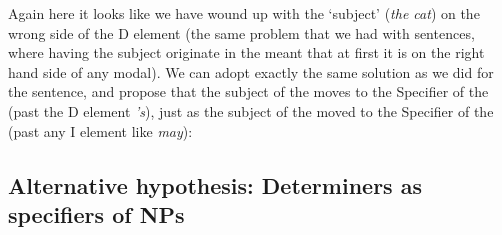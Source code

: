 \documentclass{article}
\begin{document}
Again here it looks like we have wound up with the `subject' (\emph{the cat}) on the wrong side of the D element (the same problem that we had with sentences, where having the subject originate in the  meant that at first it is on the right hand side of any modal).
We can adopt exactly the same solution as we did for the sentence, and propose that the subject of the  moves to the Specifier of the  (past the D element \emph{'s}), just as the subject of the  moved to the Specifier of the  (past any I element like \emph{may}):
\begin{exe}
\end{exe}

    \subsection{Alternative hypothesis: Determiners as specifiers of NPs}
\end{document}
